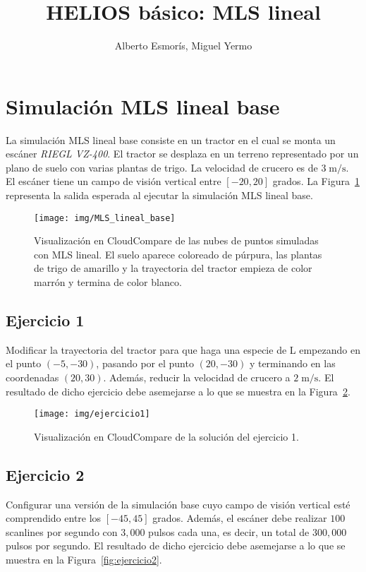 \documentclass[]{article}
\title{HELIOS básico: MLS lineal}
\author{Alberto Esmorís, Miguel Yermo}
\date{}
\begin{document}
	
	\maketitle
	
	
	
	\section*{Simulación MLS lineal base}
	La simulación MLS lineal base consiste en un tractor en el cual se monta un escáner \textit{RIEGL VZ-400}. El tractor se desplaza en un terreno representado por un plano de suelo con varias plantas de trigo. La velocidad de crucero es de $3\;\text{m}/\text{s}$. El escáner tiene un campo de visión vertical entre $[-20, 20]$ grados. La Figura~\ref{fig:mls_lineal_base} representa la salida esperada al ejecutar la simulación MLS lineal base.
	
	\begin{figure}[htb]
		\centering
		\texttt{[image: img/MLS\_lineal\_base]}
		\caption{Visualización en CloudCompare de las nubes de puntos simuladas con MLS lineal. El suelo aparece coloreado de púrpura, las plantas de trigo de amarillo y la trayectoria del tractor empieza de color marrón y termina de color blanco.}
		\label{fig:mls_lineal_base}
	\end{figure}


	\pagebreak
	

	\subsection*{Ejercicio 1}
	Modificar la trayectoria del tractor para que haga una especie de L empezando en el punto $(-5, -30)$, pasando por el punto $(20, -30)$ y terminando en las coordenadas $(20, 30)$. Además, reducir la velocidad de crucero a $2\;\text{m}/\text{s}$. El resultado de dicho ejercicio debe asemejarse a lo que se muestra en la Figura~\ref{fig:ejercicio1}.
	
	\begin{figure}[htb]
		\centering
		\texttt{[image: img/ejercicio1]}
		\caption{Visualización en CloudCompare de la solución del ejercicio 1.}
		\label{fig:ejercicio1}
	\end{figure}


	\subsection*{Ejercicio 2}
	Configurar una versión de la simulación base cuyo campo de visión vertical esté comprendido entre los $[-45, 45]$ grados. Además, el escáner debe realizar $100$ scanlines por segundo con $3,000$ pulsos cada una, es decir, un total de $300,000$ pulsos por segundo. El resultado de dicho ejercicio debe asemejarse a lo que se muestra en la Figura~\ref{fig:ejercicio2}.
	
\end{document}
